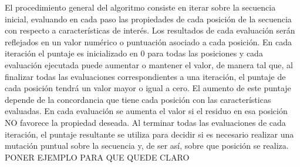 



El procedimiento general del algoritmo consiste en iterar sobre la secuencia inicial, evaluando en cada paso las propiedades de cada posición de la secuencia con respecto a características de interés. 
Los resultados de cada evaluación serán reflejados en un valor numérico o puntuación asociado a cada posición. En cada iteración el puntaje es inicializado en 0 para todas las posiciones y cada evaluación ejecutada puede aumentar o mantener el valor, de manera tal que, al finalizar todas las evaluaciones correspondientes a una iteración, el puntaje de cada posición tendrá un valor mayor o igual a cero. 
El aumento de este puntaje depende de la concordancia que tiene cada posición con las características evaluadas. En cada evaluación se aumenta el valor si el residuo en esa posición NO favorece la propiedad deseada.
Al terminar todas las evaluaciones de cada iteración, el puntaje resultante se utiliza para decidir si es necesario realizar una mutación puntual sobre la secuencia y, de ser así, sobre que posición se realiza.
PONER EJEMPLO PARA QUE QUEDE CLARO

